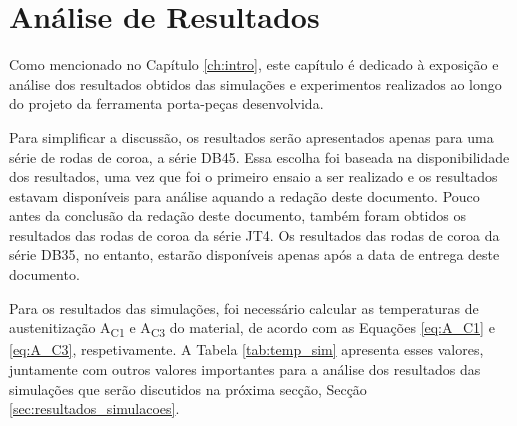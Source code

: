 \chapter{Análise de Resultados} \label{ch:resultados}
\setlength{\headheight}{13.6pt}
Como mencionado no Capítulo \ref{ch:intro}, este capítulo é dedicado à exposição e análise dos resultados obtidos das simulações e experimentos realizados ao longo do projeto da ferramenta porta-peças desenvolvida.
\par
Para simplificar a discussão, os resultados serão apresentados apenas para uma série de rodas de coroa, a série DB45. Essa escolha foi baseada na disponibilidade dos resultados, uma vez que foi o primeiro ensaio a ser realizado e os resultados estavam disponíveis para análise aquando a redação deste documento. Pouco antes da conclusão da redação deste documento, também foram obtidos os resultados das rodas de coroa da série JT4. Os resultados das rodas de coroa da série DB35, no entanto, estarão disponíveis apenas após a data de entrega deste documento.
\par
Para os resultados das simulações, foi necessário calcular as temperaturas de austenitização A\textsubscript{C1} e A\textsubscript{C3} do material, de acordo com as Equações \ref{eq:A_C1} e \ref{eq:A_C3}, respetivamente. A Tabela \ref{tab:temp_sim} apresenta esses valores, juntamente com outros valores importantes para a análise dos resultados das simulações que serão discutidos na próxima secção, Secção \ref{sec:resultados_simulacoes}.
